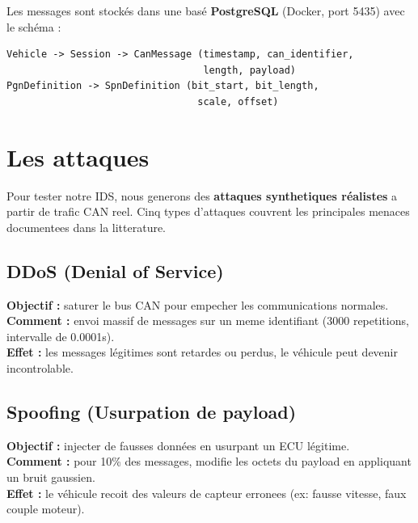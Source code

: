 \documentclass[12pt,a4paper]{article}
\begin{document}
Les messages sont stockés dans une basé \textbf{PostgreSQL} (Docker, port 5435) avec le schéma :
\begin{verbatim}
Vehicle -> Session -> CanMessage (timestamp, can_identifier,
                                  length, payload)
PgnDefinition -> SpnDefinition (bit_start, bit_length,
                                 scale, offset)
\end{verbatim}

\section{Les attaques}

Pour tester notre IDS, nous generons des \textbf{attaques synthetiques réalistes} a partir de trafic CAN reel. Cinq types d'attaques couvrent les principales menaces documentees dans la litterature.

\subsection{DDoS (Denial of Service)}

\begin{tcolorbox}[colback=red!5, colframe=red!50!black]
\textbf{Objectif :} saturer le bus CAN pour empecher les communications normales.\\
\textbf{Comment :} envoi massif de messages sur un meme identifiant (3000 repetitions, intervalle de 0.0001s).\\
\textbf{Effet :} les messages légitimes sont retardes ou perdus, le véhicule peut devenir incontrolable.
\end{tcolorbox}

\subsection{Spoofing (Usurpation de payload)}

\begin{tcolorbox}[colback=red!5, colframe=red!50!black]
\textbf{Objectif :} injecter de fausses données en usurpant un ECU légitime.\\
\textbf{Comment :} pour 10\% des messages, modifie les octets du payload en appliquant un bruit gaussien.\\
\textbf{Effet :} le véhicule recoit des valeurs de capteur erronees (ex: fausse vitesse, faux couple moteur).
\end{tcolorbox}
\end{document}
